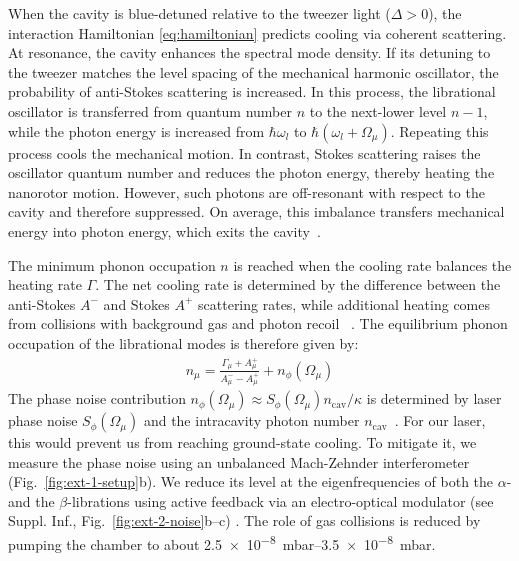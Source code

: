 \documentclass[reprint, amsmath, amssymb, superscriptaddress,showkeys,aps,pra]{revtex4-2}
\begin{document}
When the cavity is blue-detuned relative to the tweezer light ($\Delta>0$), the interaction Hamiltonian \eqref{eq:hamiltonian} predicts cooling via coherent scattering. At resonance, the cavity enhances the spectral mode density.  If its detuning to the tweezer matches the level spacing of the mechanical harmonic oscillator, the probability of anti-Stokes scattering is increased. In this process, the librational oscillator is transferred from quantum number $n$ to the next-lower level $n-1$, while the  photon energy is increased from $\hbar\omega_l$ to $\hbar(\omega_l+\Omega_\mu)$. Repeating this process cools the mechanical motion. In contrast, Stokes scattering raises the oscillator quantum number and reduces the photon energy, thereby heating the nanorotor motion. However, such photons are off-resonant with respect to the cavity and therefore suppressed. On average, this imbalance transfers mechanical energy into photon energy, which exits the cavity~\cite{hechenblaikner_cooling_1998,vuletic_three-dimensional_2001,delic_cooling_2020}.

The minimum phonon occupation $n$ is reached when the cooling rate balances the heating rate $\Gamma$.
The net cooling rate is determined by the difference between the anti-Stokes $A^-$  and Stokes $A^+$ scattering rates, while additional heating comes from collisions with background gas and photon recoil ~\cite{jain_direct_2016}. The equilibrium phonon occupation of the librational modes is therefore given by:
\begin{align}
    n_\mu=\frac{\Gamma_\mu+A_\mu^+}{A_\mu^--A_\mu^+} +n_\phi(\Omega_\mu)
    \label{eq:final_occupation}
\end{align}
The phase noise contribution $ n_\phi(\Omega_\mu) \approx S_\phi(\Omega_\mu) n_{\text{cav}}/\kappa$ is determined by laser phase noise $S_\phi(\Omega_\mu)$ and the intracavity photon number $n_{\text{cav}}$~\cite{rabl_phase-noise_2009,Meyer2019}. For our laser, this would prevent us from reaching ground-state cooling. To mitigate it, we measure the phase noise using an unbalanced Mach-Zehnder interferometer (Fig.~\ref{fig:ext-1-setup}b). We reduce its level at the eigenfrequencies of both the $\alpha$- and the $\beta$-librations using active feedback via an electro-optical modulator (see Suppl. Inf., Fig.~\ref{fig:ext-2-noise}b--c) \cite{parniak_high-frequency_2021,dania_high-purity_2025}. The role of gas collisions is reduced by pumping the chamber to about \qtyrange{2.5e-8}{3.5e-8}{mbar}.

\end{document}
